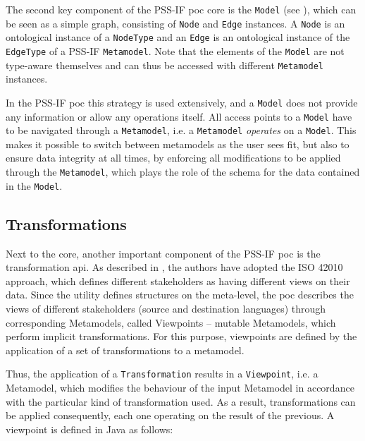 The second key component of the PSS-IF \gls{poc} core is the \texttt{Model} (see ), which can be seen as a simple graph, consisting of \texttt{Node} and \texttt{Edge} instances. A \texttt{Node} is an ontological instance of a \texttt{NodeType} and an \texttt{Edge} is an ontological instance of the \texttt{EdgeType} of a PSS-IF \texttt{Metamodel}. Note that the elements of the \texttt{Model} are not type-aware themselves and can thus be accessed with different \texttt{Metamodel} instances.

In the PSS-IF \gls{poc} this strategy is used extensively, and a \texttt{Model} does not provide any information or allow any operations itself. All access points to a \texttt{Model} have to be navigated through a \texttt{Metamodel}, i.e. a \texttt{Metamodel} \textit{operates} on a \texttt{Model}. This makes it possible to switch between metamodels as the user sees fit, but also to ensure data integrity at all times, by enforcing all modifications to be applied through the \texttt{Metamodel}, which plays the role of the schema for the data contained in the \texttt{Model}.

\subsection{Transformations}

Next to the core, another important component of the PSS-IF \gls{poc} is the transformation \gls{api}. As described in , the authors have adopted the ISO 42010 approach, which defines different stakeholders as having different views on their data. Since the utility defines structures on the meta-level, the \gls{poc} describes the views of different stakeholders (source and destination languages) through corresponding Metamodels, called Viewpoints -- mutable Metamodels, which perform implicit transformations. For this purpose, viewpoints are defined by the application of a set of transformations to a metamodel.

Thus, the application of a \texttt{Transformation} results in a \texttt{Viewpoint}, i.e. a Metamodel, which modifies the behaviour of the input Metamodel in accordance with the particular kind of transformation used. As a result, transformations can be applied consequently, each one operating on the result of the previous. A viewpoint is defined in Java as follows:

